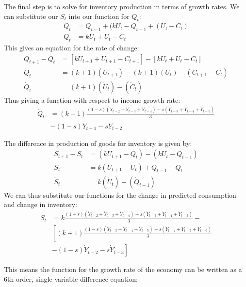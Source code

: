 The final step is to solve for inventory production in terms of growth rates. We can substitute our $S_t$ into our function for $Q_t$:
\begin{align*}
    Q_t&=Q_{t-1}+(kU_t-Q_{t-1}+(U_t-C_t)\\
    Q_t&=kU_t+U_t-C_t
\end{align*}
This gives an equation for the rate of change:
\begin{align*}
    Q_{t+1}-Q_{t}&=\left[kU_{t+1}+U_{t+1}-C_{t+1}\right]-\left[kU_{t}+U_{t}-C_{t}\right]\\
    \dot Q_t&= (k+1)(U_{t+1})-(k+1)(U_t)-(C_{t+1}-C_t)\\
    \dot Q_t&=(k+1)(\dot U_t)-(\dot C_t)
\end{align*}
Thus giving a function with respect to income growth rate:
\begin{equation}
\begin{split}
    \dot Q_t& = (k+1)\frac{(1-s)(\dot Y_{t-2}+\dot Y_{t-3}+\dot Y_{t-4})+s(\dot Y_{t-3}+\dot Y_{t-4}+\dot Y_{t-5})}{3}\\
    &-(1-s)\dot Y_{t-1}-s\dot Y_{t-2}
\end{split}
\end{equation}

The difference in production of goods for inventory is given by:
\begin{align*}
    S_{t+1}-S_{t}& =(kU_{t+1}-Q_{t})-(kU_{t}-Q_{t-1})\\
    \dot S_t &= k(U_{t+1}-U_t)+Q_{t-1}-Q_t\\
    \dot S_t& = k(\dot U_t)-(\dot Q_{t-1})
\end{align*}
We can thus substitute our functions for the change in predicted consumption and change in inventory:
\begin{equation}
\begin{split}
    \dot S_t& =k\frac{(1-s)(\dot Y_{t-2}+\dot Y_{t-3}+\dot Y_{t-4})+s(\dot Y_{t-3}+\dot Y_{t-4}+\dot Y_{t-5})}{3}-\\
    &\left[(k+1)\frac{(1-s)(\dot Y_{t-3}+\dot Y_{t-4}+\dot Y_{t-5})+s(\dot Y_{t-4}+\dot Y_{t-5}+\dot Y_{t-6})}{3}\right.\\
    &\left.-(1-s)\dot Y_{t-2}-s\dot Y_{t-3}\right]
\end{split}
\end{equation}

This means the function for the growth rate of the economy can be written as a 6th order, single-variable difference equation:

